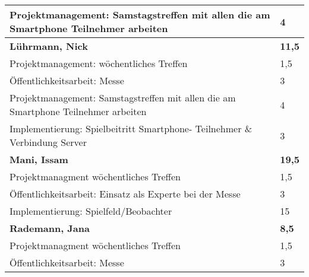 \documentclass[a4paper,11pt]{scrartcl}
\begin{document}
\begin{longtable}{| p{13.8cm} | C{2.4cm} |}
  Projektmanagement: Samstagstreffen mit allen die am Smartphone Teilnehmer arbeiten
	&
  4
	\\
	\hline
	\hline


	\textbf{Lührmann, Nick} & \textbf{11,5}\\ %
	\hline

	Projektmanagement: wöchentliches Treffen
	&
	1,5
	\\
	\hline

	Öffentlichkeitsarbeit: Messe
	&
  3
	\\
	\hline

  Projektmanagement: Samstagstreffen mit allen die am Smartphone Teilnehmer arbeiten
	&
  4
	\\
	\hline

  Implementierung: Spielbeitritt Smartphone- Teilnehmer \& Verbindung Server
	&
  3
	\\
	\hline
	\hline


	\textbf{Mani, Issam} & \textbf{19,5}\\ %
	\hline

  Projektmanagment wöchentliches Treffen
	&
  1,5
	\\
	\hline

  Öffentlichkeitsarbeit: Einsatz als Experte bei der Messe
	&
  3
	\\
	\hline

  Implementierung: Spielfeld/Beobachter
	&
  15
	\\
	\hline
	\hline


	\textbf{Rademann, Jana} & \textbf{8,5}\\ %
	\hline

  Projektmanagment wöchentliches Treffen
	&
  1,5
	\\
	\hline

  Öffentlichkeitsarbeit: Messe
	&
  3
	\\
	\hline


\end{longtable}
\end{document}
